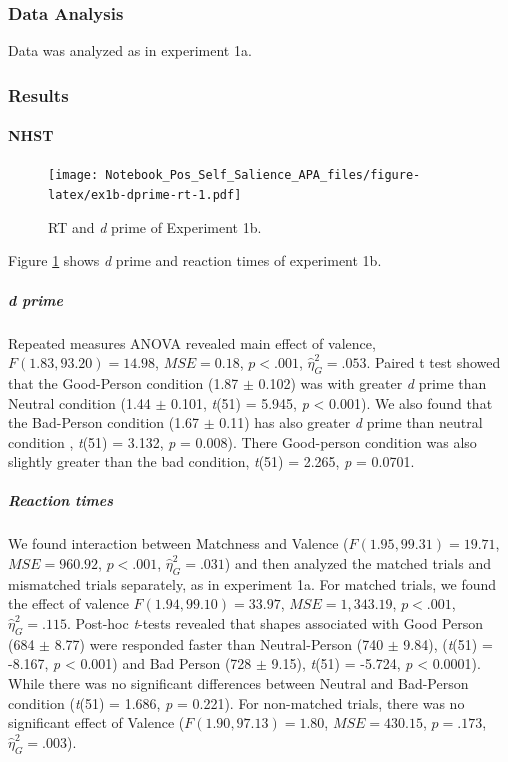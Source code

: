 \documentclass[
  english,
  man]{apa6}
\let\oldparagraph\paragraph
\renewcommand{\paragraph}[1]{\oldparagraph{#1}\mbox{}}
\let\oldsubparagraph\subparagraph
\renewcommand{\subparagraph}[1]{\oldsubparagraph{#1}\mbox{}}
\begin{document}
\hypertarget{data-analysis-2}{%
\subsubsection{Data Analysis}\label{data-analysis-2}}

Data was analyzed as in experiment 1a.

\hypertarget{results-1}{%
\subsubsection{Results}\label{results-1}}

\hypertarget{nhst}{%
\paragraph{NHST}\label{nhst}}

\begin{figure}
\centering
\texttt{[image: Notebook\_Pos\_Self\_Salience\_APA\_files/figure-latex/ex1b-dprime-rt-1.pdf]}
\caption{\label{fig:ex1b-dprime-rt}RT and \emph{d} prime of Experiment 1b.}
\end{figure}

Figure \ref{fig:ex1b-dprime-rt} shows \emph{d} prime and reaction times of experiment 1b.

\hypertarget{d-prime-2}{%
\subparagraph{d prime}\label{d-prime-2}}

Repeated measures ANOVA revealed main effect of valence, \(F(1.83, 93.20) = 14.98\), \(\mathit{MSE} = 0.18\), \(p < .001\), \(\hat{\eta}^2_G = .053\). Paired t test showed that the Good-Person condition (1.87 \(\pm\) 0.102) was with greater \emph{d} prime than Neutral condition (1.44 \(\pm\) 0.101, \emph{t}(51) = 5.945, \emph{p} \textless{} 0.001). We also found that the Bad-Person condition (1.67 \(\pm\) 0.11) has also greater \emph{d} prime than neutral condition , \emph{t}(51) = 3.132, \emph{p} = 0.008). There Good-person condition was also slightly greater than the bad condition, \emph{t}(51) = 2.265, \emph{p} = 0.0701.

\hypertarget{reaction-times-2}{%
\subparagraph{Reaction times}\label{reaction-times-2}}

We found interaction between Matchness and Valence (\(F(1.95, 99.31) = 19.71\), \(\mathit{MSE} = 960.92\), \(p < .001\), \(\hat{\eta}^2_G = .031\)) and then analyzed the matched trials and mismatched trials separately, as in experiment 1a. For matched trials, we found the effect of valence \(F(1.94, 99.10) = 33.97\), \(\mathit{MSE} = 1,343.19\), \(p < .001\), \(\hat{\eta}^2_G = .115\). Post-hoc \emph{t}-tests revealed that shapes associated with Good Person (684 \(\pm\) 8.77) were responded faster than Neutral-Person (740 \(\pm\) 9.84), (\emph{t}(51) = -8.167, \emph{p} \textless{} 0.001) and Bad Person (728 \(\pm\) 9.15), \emph{t}(51) = -5.724, \emph{p} \textless{} 0.0001). While there was no significant differences between Neutral and Bad-Person condition (\emph{t}(51) = 1.686, \emph{p} = 0.221). For non-matched trials, there was no significant effect of Valence (\(F(1.90, 97.13) = 1.80\), \(\mathit{MSE} = 430.15\), \(p = .173\), \(\hat{\eta}^2_G = .003\)).
\end{document}
